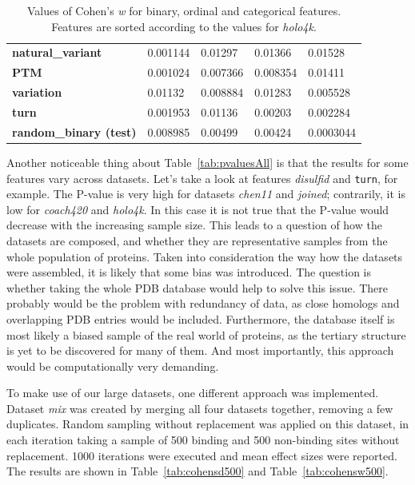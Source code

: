 \begin{table}[]
\begin{tabular}{@{}lllll@{}}
\textbf{natural\_variant}     & 0.001144        & 0.01297           & 0.01366         & 0.01528         \\
\textbf{PTM}                  & 0.001024        & 0.007366          & 0.008354        & 0.01411         \\
\textbf{variation}            & 0.01132         & 0.008884          & 0.01283         & 0.005528        \\
\textbf{turn}                 & 0.001953        & 0.01136           & 0.00203         & 0.002284        \\
\textbf{random\_binary (test)}       & 0.008985        & 0.00499           & 0.00424         & 0.0003044       \\ \bottomrule
\end{tabular}
\caption{Values of Cohen's \textit{w} for binary, ordinal and categorical features. Features are sorted according to the values for \textit{holo4k}.}
\label{tab:cohensw}
\end{table}

Another noticeable thing about Table~\ref{tab:pvaluesAll} is that the results for some features vary across datasets. Let's take a look at features \textit{disulfid} and \texttt{turn}, for example. The P-value is very high for datasets \textit{chen11} and \textit{joined}; contrarily, it is low for \textit{coach420} and \textit{holo4k}. In this case it is not true that the P-value would decrease with the increasing sample size. This leads to a question of how the datasets are composed, and whether they are representative samples from the whole population of proteins. Taken into consideration the way how the datasets were assembled, it is likely that some bias was introduced. The question is whether taking the whole PDB database would help to solve this issue. There probably would be the problem with redundancy of data, as close homologs and overlapping PDB entries would be included. Furthermore, the database itself is most likely a biased sample of the real world of proteins, as the tertiary structure is yet to be discovered for many of them. And most importantly, this approach would be computationally very demanding.

To make use of our large datasets, one different approach was implemented. Dataset \textit{mix} was created by merging all four datasets together, removing a few duplicates. Random sampling without replacement was applied on this dataset, in each iteration taking a sample of 500 binding and 500 non-binding sites without replacement. 1000 iterations were executed and mean effect sizes were reported. The results are shown in Table~\ref{tab:cohensd500} and Table~\ref{tab:cohensw500}.

